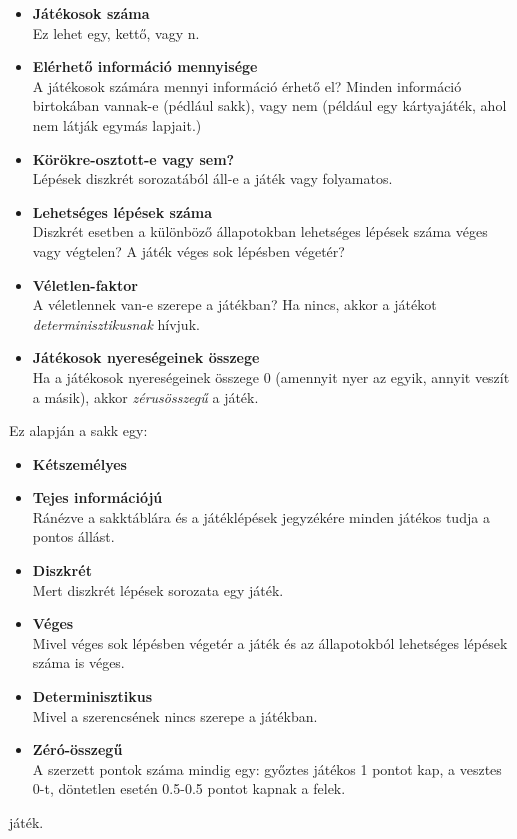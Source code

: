 \documentclass[twoside, a4paper, 12pt]{book}
\begin{document}
\begin{itemize}
	\item \textbf{Játékosok száma} \\
	Ez lehet egy, kettő, vagy n.
	
	\item \textbf{Elérhető információ mennyisége} \\
	A játékosok számára mennyi információ érhető el? Minden információ birtokában vannak-e (pédlául sakk), vagy nem (például egy kártyajáték, ahol nem látják egymás lapjait.)
	
	\item \textbf{Körökre-osztott-e vagy sem?} \\
	Lépések diszkrét sorozatából áll-e a játék vagy folyamatos.
	
	\item \textbf{Lehetséges lépések száma} \\
	Diszkrét esetben a különböző állapotokban lehetséges lépések száma véges vagy végtelen? A játék véges sok lépésben végetér?
	
	\item \textbf{Véletlen-faktor} \\
	A véletlennek van-e szerepe a játékban? Ha nincs, akkor a játékot \textit{determinisztikusnak} hívjuk.
	
	\item \textbf{Játékosok nyereségeinek összege} \\
	Ha a játékosok nyereségeinek összege 0 (amennyit nyer az egyik, annyit veszít a másik), akkor \textit{zérusösszegű} a játék.
\end{itemize}

Ez alapján a sakk egy:
\begin{itemize}
	\item \textbf{Kétszemélyes}
	
	\item \textbf{Tejes információjú} \\
	Ránézve a sakktáblára és a játéklépések jegyzékére minden játékos tudja a pontos állást.
	
	\item \textbf{Diszkrét} \\
	Mert diszkrét lépések sorozata egy játék.
	
	\item \textbf{Véges} \\
	Mivel véges sok lépésben végetér a játék és az állapotokból lehetséges lépések száma is véges.
	
	\item \textbf{Determinisztikus} \\
	Mivel a szerencsének nincs szerepe a játékban.
	
	\item \textbf{Zéró-összegű} \\
	A szerzett pontok száma mindig egy: győztes játékos 1 pontot kap, a vesztes 0-t, döntetlen esetén 0.5-0.5 pontot kapnak a felek.
\end{itemize}
játék.
\end{document}
